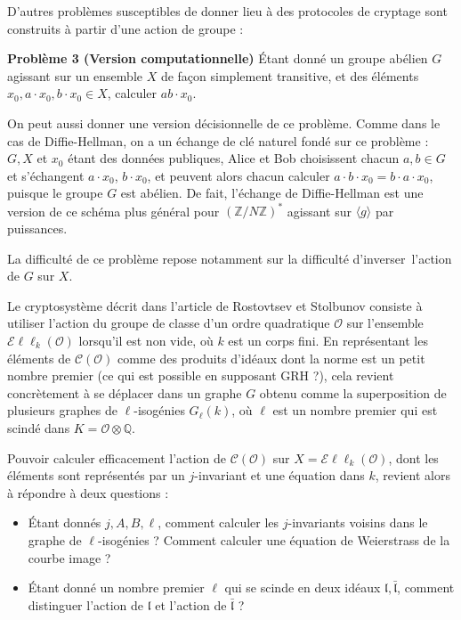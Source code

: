 \documentclass[11pt,a4paper]{article}
\newcommand{\Z}{\mathbb{Z}}
\newcommand{\Q}{\mathbb{Q}}
\renewcommand{\O}{\mathcal{O}}
\newcommand{\Cl}{\mathcal{C}}
\newcommand{\Ell}{\mathcal{E}\ell\ell}
\renewcommand{\frak}{\mathfrak}
\theoremstyle{definition}
\begin{document}
\vspace{5mm}

D'autres problèmes susceptibles de donner lieu à des protocoles de cryptage sont construits à partir d'une action de groupe :

\textbf{Problème 3 (Version computationnelle)} \'Etant donné un groupe abélien $G$ agissant sur un ensemble $X$ de façon simplement transitive, et des éléments $x_0, a\cdot x_0, b\cdot x_0\in X$, calculer $ab\cdot x_0$.

On peut aussi donner une version décisionnelle de ce problème. Comme dans le cas de Diffie-Hellman, on a un échange de clé naturel fondé sur ce problème : $G, X$ et $x_0$ étant des données publiques, Alice et Bob choisissent chacun $a,b\in G$ et s'échangent $a\cdot x_0$, $b\cdot x_0$, et peuvent alors chacun calculer $a\cdot b\cdot x_0=b\cdot a\cdot x_0$, puisque le groupe $G$ est abélien. De fait, l'échange de Diffie-Hellman est une version de ce schéma plus général pour $(\Z/N\Z)^*$ agissant sur $\langle g\rangle$ par puissances.

La difficulté de ce problème repose notamment sur la difficulté d'\og inverser\fg\ l'action de $G$ sur $X$.

\vspace{5mm}

Le cryptosystème décrit dans l'article de Rostovtsev et Stolbunov consiste à utiliser l'action du groupe de classe d'un ordre quadratique $\O$ sur l'ensemble $\Ell_k(\O)$ lorsqu'il est non vide, où $k$ est un corps fini. En représentant les éléments de $\Cl(\O)$ comme des produits d'idéaux dont la norme est un petit nombre premier (ce qui est possible en supposant GRH ?), cela revient concrètement à se déplacer dans un graphe $G$ obtenu comme la superposition de plusieurs graphes de $\ell$-isogénies $G_\ell(k)$, où $\ell$ est un nombre premier qui est scindé dans $K=\O\otimes\Q$.

Pouvoir calculer efficacement l'action de $\Cl(\O)$ sur $X=\Ell_k(\O)$, dont les éléments sont représentés par un $j$-invariant et une équation dans $k$, revient alors à répondre à deux questions :
\begin{itemize}
\item \'Etant donnés $j,A,B,\ell$, comment calculer les $j$-invariants voisins dans le graphe de $\ell$-isogénies ? Comment calculer une équation de Weierstrass de la courbe image ?
\item \'Etant donné un nombre premier $\ell$ qui se scinde en deux idéaux $\frak l,\bar{\frak l}$, comment distinguer l'action de $\frak l$ et l'action de $\bar{\frak l}$ ?
\end{itemize}
\end{document}
